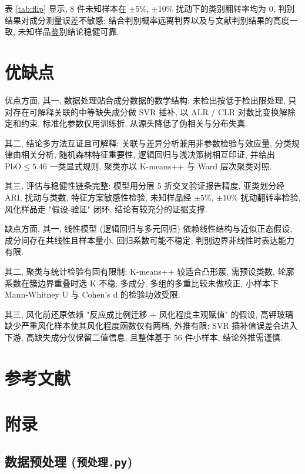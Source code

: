 \documentclass{ctexart}
\begin{document}
表 \ref{tab:flip} 显示, $8$ 件未知样本在 $\pm5\%$, $\pm10\%$ 扰动下的类别翻转率均为 $0$, 判别结果对成分测量误差不敏感; 结合判别概率远离判界以及与文献判别结果的高度一致, 未知样品鉴别结论稳健可靠.

\section{优缺点}

优点方面, 其一, 数据处理贴合成分数据的数学结构: 未检出按低于检出限处理, 只对存在可解释关联的中等缺失成分做 SVR 插补, 以 ALR / CLR 对数比变换解除定和约束, 标准化参数仅用训练折, 从源头降低了伪相关与分布失真.

其二, 结论多方法互证且可解释: 关联与差异分析兼用非参数检验与效应量, 分类规律由相关分析, 随机森林特征重要性, 逻辑回归与浅决策树相互印证, 并给出 $\mathrm{PbO}\le5.46$ 一类显式规则, 聚类亦以 K-means++ 与 Ward 层次聚类对照.

其三, 评估与稳健性链条完整: 模型用分层 $5$ 折交叉验证报告精度, 亚类划分经 ARI, 扰动与类数, 特征方案敏感性检验, 未知样品经 $\pm5\%$, $\pm10\%$ 扰动翻转率检验, 风化样品走 "假设-验证" 闭环, 结论有较充分的证据支撑.

缺点方面, 其一, 线性模型 (逻辑回归与多元回归) 依赖线性结构与近似正态假设, 成分间存在共线性且样本量小, 回归系数可能不稳定, 判别边界非线性时表达能力有限.

其二, 聚类与统计检验有固有限制: K-means++ 较适合凸形簇, 需预设类数, 轮廓系数在簇边界重叠时选 K 不稳; 多成分, 多组的多重比较未做校正, 小样本下 Mann-Whitney U 与 Cohen's d 的检验功效受限.

其三, 风化前还原依赖 "反应成比例迁移 + 风化程度主观赋值" 的假设, 高钾玻璃缺少严重风化样本使其风化程度函数仅有两档, 外推有限; SVR 插补值误差会进入下游, 高缺失成分仅保留二值信息, 且整体基于 $56$ 件小样本, 结论外推需谨慎.

\section{参考文献}

\printbibliography[heading=none]

\newpage

\section{附录}

\subsection{数据预处理 (\normalfont\texttt{预处理.py})}
\label{app:pre}
\end{document}
